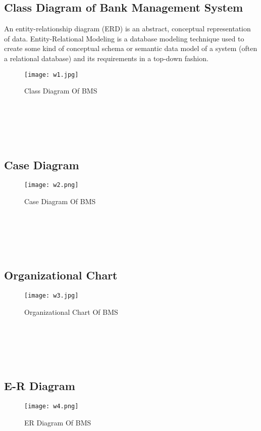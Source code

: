 \documentclass{article}
\begin{document}
\subsection{Class Diagram of Bank Management System}
An entity-relationship diagram (ERD) is an abstract, conceptual representation of data. Entity-Relational Modeling is a database modeling technique used to create some kind of conceptual schema or semantic data model of a system (often a relational database) and its requirements in a top-down fashion.
\begin{figure}[htp]
    \centering
    \texttt{[image: w1.jpg]}
    \caption{Class Diagram Of BMS }
    \label{fig:Class Diagram Of BMS  }
\end{figure}
\\\\\\\
\newpage
\subsection{Case Diagram}
\begin{figure}[htp]
    \centering
    \texttt{[image: w2.png]}
    \caption{Case Diagram Of BMS }
    \label{fig:Case Diagram Of BMS  }
\end{figure}
\\\\\\\

\newpage
\subsection{Organizational Chart}
\begin{figure}[htp]
    \centering
    \texttt{[image: w3.jpg]}
    \caption{Organizational Chart Of BMS }
    \label{fig:Case Diagram Of BMS  }
\end{figure}
\\\\\\\
\newpage
\subsection{E-R Diagram}
\begin{figure}[htp]
    \centering
    \texttt{[image: w4.png]}
    \caption{ER Diagram Of BMS }
    \label{fig:ER Diagram Of BMS  }
\end{figure}


\newpage
\end{document}
